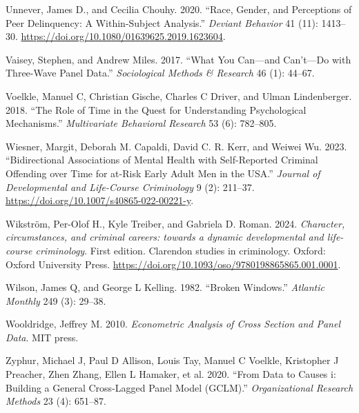 \documentclass[
  letterpaper,
  DIV=11,
  numbers=noendperiod]{scrartcl}
\newlength{\cslhangindent}
\newenvironment{CSLReferences}[2] %
 {\begin{list}{}{%
  \setlength{\itemindent}{0pt}
  \setlength{\leftmargin}{0pt}
  \setlength{\parsep}{0pt}
  \ifodd #1
   \setlength{\leftmargin}{\cslhangindent}
   \setlength{\itemindent}{-1\cslhangindent}
  \fi
  \setlength{\itemsep}{#2\baselineskip}}}
 {\end{list}}
\begin{document}
\begin{CSLReferences}{1}{0}
Unnever, James D., and Cecilia Chouhy. 2020. {``Race, Gender, and
Perceptions of Peer Delinquency: A Within-Subject Analysis.''}
\emph{Deviant Behavior} 41 (11): 1413--30.
\url{https://doi.org/10.1080/01639625.2019.1623604}.

Vaisey, Stephen, and Andrew Miles. 2017. {``What You Can---and
Can't---Do with Three-Wave Panel Data.''} \emph{Sociological Methods \&
Research} 46 (1): 44--67.

Voelkle, Manuel C, Christian Gische, Charles C Driver, and Ulman
Lindenberger. 2018. {``The Role of Time in the Quest for Understanding
Psychological Mechanisms.''} \emph{Multivariate Behavioral Research} 53
(6): 782--805.

Wiesner, Margit, Deborah M. Capaldi, David C. R. Kerr, and Weiwei Wu.
2023. {``Bidirectional Associations of Mental Health with Self-Reported
Criminal Offending over Time for at-Risk Early Adult Men in the USA.''}
\emph{Journal of Developmental and Life-Course Criminology} 9 (2):
211--37. \url{https://doi.org/10.1007/s40865-022-00221-y}.

Wikström, Per-Olof H., Kyle Treiber, and Gabriela D. Roman. 2024.
\emph{Character, circumstances, and criminal careers: towards a dynamic
developmental and life-course criminology}. First edition. Clarendon
studies in criminology. Oxford: Oxford University Press.
\url{https://doi.org/10.1093/oso/9780198865865.001.0001}.

Wilson, James Q, and George L Kelling. 1982. {``Broken Windows.''}
\emph{Atlantic Monthly} 249 (3): 29--38.

Wooldridge, Jeffrey M. 2010. \emph{Econometric Analysis of Cross Section
and Panel Data}. MIT press.

Zyphur, Michael J, Paul D Allison, Louis Tay, Manuel C Voelkle,
Kristopher J Preacher, Zhen Zhang, Ellen L Hamaker, et al. 2020. {``From
Data to Causes i: Building a General Cross-Lagged Panel Model (GCLM).''}
\emph{Organizational Research Methods} 23 (4): 651--87.

\end{CSLReferences}
\end{document}
